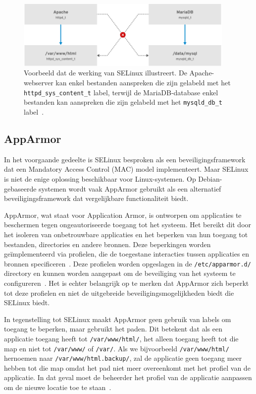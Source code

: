 \begin{figure}[h!]
    \begin{center}
        \includegraphics[width=300pt]
        {./graphics/linux/selinux-example.png}
        \caption{\label{fig:sleinux-example}Voorbeeld dat de werking van SELinux illustreert. De Apache-webserver kan enkel bestanden aanspreken die zijn gelabeld met het \texttt{httpd\_sys\_content\_t} label, terwijl de MariaDB-database enkel bestanden kan aanspreken die zijn gelabeld met het \texttt{mysqld\_db\_t} label~\autocite{selinux-rhel8}.}
    \end{center}
\end{figure}

\subsection{AppArmor}
\label{linux_apparmor}

In het voorgaande gedeelte is SELinux besproken als een beveiligingsframework dat een Mandatory Access Control (MAC) model implementeert.
Maar SELinux is niet de enige oplossing beschikbaar voor Linux-systemen.
Op Debian-gebaseerde systemen wordt vaak AppArmor gebruikt als een alternatief beveiligingsframework dat vergelijkbare functionaliteit biedt.

AppArmor, wat staat voor Application Armor, is ontworpen om applicaties te beschermen tegen ongeautoriseerde toegang tot het systeem.
Het bereikt dit door het isoleren van onbetrouwbare applicaties en het beperken van hun toegang tot bestanden, directories en andere bronnen.
Deze beperkingen worden ge\"implementeerd via profielen, die de toegestane interacties tussen applicaties en bronnen specificeren~\autocite{gruenbacher2007apparmor}.
Deze profielen worden opgeslagen in de \texttt{/etc/apparmor.d/} directory en kunnen worden aangepast om de beveiliging van het systeem te configureren~\autocite{apparmor-ubuntu}.
Het is echter belangrijk op te merken dat AppArmor zich beperkt tot deze profielen en niet de uitgebreide beveiligingsmogelijkheden biedt die SELinux biedt.

In tegenstelling tot SELinux maakt AppArmor geen gebruik van labels om toegang te beperken, maar gebruikt het paden.
Dit betekent dat als een applicatie toegang heeft tot \texttt{/var/www/html/}, het alleen toegang heeft tot die map en niet tot \texttt{/var/www/} of \texttt{/var/}.
Als we bijvoorbeeld \texttt{/var/www/html/} hernoemen naar \texttt{/var/www/html.backup/}, zal de applicatie geen toegang meer hebben tot die map omdat het pad niet meer overeenkomt met het profiel van de applicatie.
In dat geval moet de beheerder het profiel van de applicatie aanpassen om de nieuwe locatie toe te staan~\autocite{gruenbacher2007apparmor}.
